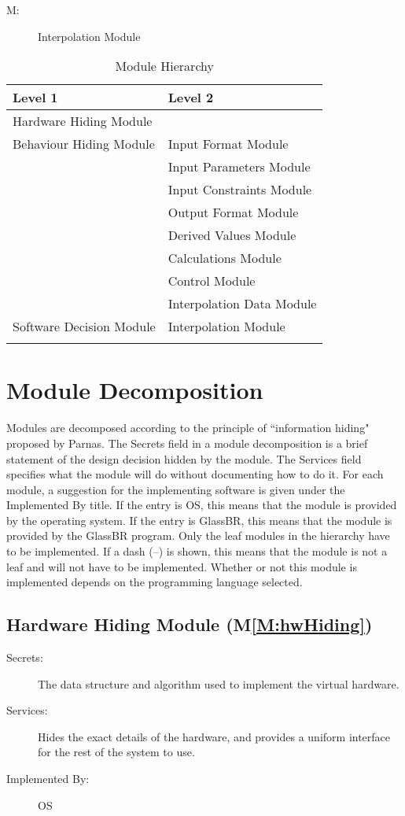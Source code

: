 \documentclass[12pt]{article}
\newcounter{modnum}
\newcommand{\mthemodnum}{M\themodnum}
\begin{document}
\begin{description}
\item[\mthemodnum\label{M:modInterpolation}:]Interpolation Module
\end{description}
\begin{longtable}{l l}
\toprule
Level 1 & Level 2
\\
\midrule
Hardware Hiding Module & 
\\
Behaviour Hiding Module & Input Format Module
\\
 & Input Parameters Module
\\
 & Input Constraints Module
\\
 & Output Format Module
\\
 & Derived Values Module
\\
 & Calculations Module
\\
 & Control Module
\\
 & Interpolation Data Module
\\
Software Decision Module & Interpolation Module
\\
\bottomrule
\caption{Module Hierarchy}
\label{Table:ModuHier}
\end{longtable}
\section{Module Decomposition}
\label{Sec:ModuDeco}
Modules are decomposed according to the principle of ``information hiding" proposed by Parnas. The Secrets field in a module decomposition is a brief statement of the design decision hidden by the module. The Services field specifies what the module will do without documenting how to do it. For each module, a suggestion for the implementing software is given under the Implemented By title. If the entry is OS, this means that the module is provided by the operating system. If the entry is GlassBR, this means that the module is provided by the GlassBR program. Only the leaf modules in the hierarchy have to be implemented. If a dash (--) is shown, this means that the module is not a leaf and will not have to be implemented. Whether or not this module is implemented depends on the programming language selected.
\subsection{Hardware Hiding Module (M\ref{M:hwHiding})}
\label{Sec:HardHidiModu()}
\begin{description}
\item[Secrets:]The data structure and algorithm used to implement the virtual hardware.
\item[Services:]Hides the exact details of the hardware, and provides a uniform interface for the rest of the system to use.
\item[Implemented By:]OS
\end{description}
\end{document}
